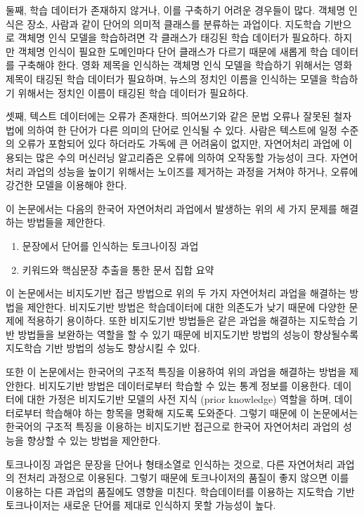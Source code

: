 \documentclass[oneside, ko,phd]{snuthesis_utf8_kor}
\begin{document}
둘째, 학습 데이터가 존재하지 않거나, 이를 구축하기 어려운 경우들이 많다.
객체명 인식은 장소, 사람과 같이 단어의 의미적 클래스를 분류하는 과업이다.
지도학습 기반으로 객체명 인식 모델을 학습하려면 각 클래스가 태깅된 학습 데이터가 필요하다.
하지만 객체명 인식이 필요한 도메인마다 단어 클래스가 다르기 때문에 새롭게 학습 데이터를 구축해야 한다.
영화 제목을 인식하는 객체명 인식 모델을 학습하기 위해서는 영화 제목이 태깅된 학습 데이터가 필요하며, 뉴스의 정치인 이름을 인식하는 모델을 학습하기 위해서는 정치인 이름이 태깅된 학습 데이터가 필요하다.

셋째, 텍스트 데이터에는 오류가 존재한다.
띄어쓰기와 같은 문법 오류나 잘못된 철자법에 의하여 한 단어가 다른 의미의 단어로 인식될 수 있다.
사람은 텍스트에 일정 수준의 오류가 포함되어 있다 하더라도 가독에 큰 어려움이 없지만, 자연어처리 과업에 이용되는 많은 수의 머신러닝 알고리즘은 오류에 의하여 오작동할 가능성이 크다.
자연어처리 과업의 성능을 높이기 위해서는 노이즈를 제거하는 과정을 거쳐야 하거나, 오류에 강건한 모델을 이용해야 한다.

이 논문에서는 다음의 한국어 자연어처리 과업에서 발생하는 위의 세 가지 문제를 해결하는 방법들을 제안한다.

\begin{enumerate}
    \item 문장에서 단어를 인식하는 토크나이징 과업
    \item 키워드와 핵심문장 추출을 통한 문서 집합 요약
\end{enumerate}

이 논문에서는 비지도기반 접근 방법으로 위의 두 가지 자연어처리 과업을 해결하는 방법을 제안한다.
비지도기반 방법은 학습데이터에 대한 의존도가 낮기 때문에 다양한 문제에 적용하기 용이하다.
또한 비지도기반 방법들은 같은 과업을 해결하는 지도학습 기반 방법들을 보완하는 역할을 할 수 있기 때문에 비지도기반 방법의 성능이 향상될수록 지도학습 기반 방법의 성능도 향상시킬 수 있다.

또한 이 논문에서는 한국어의 구조적 특징을 이용하여 위의 과업을 해결하는 방법을 제안한다.
비지도기반 방법은 데이터로부터 학습할 수 있는 통계 정보를 이용한다.
데이터에 대한 가정은 비지도기반 모델의 사전 지식 (prior knowledge) 역할을 하며, 데이터로부터 학습해야 하는 항목을 명확해 지도록 도와준다.
그렇기 때문에 이 논문에서는 한국어의 구조적 특징을 이용하는 비지도기반 접근으로 한국어 자연어처리 과업의 성능을 향상할 수 있는 방법을 제안한다.

토크나이징 과업은 문장을 단어나 형태소열로 인식하는 것으로, 다른 자연어처리 과업의 전처리 과정으로 이용된다.
그렇기 때문에 토크나이저의 품질이 좋지 않으면 이를 이용하는 다른 과업의 품질에도 영향을 미친다.
학습데이터를 이용하는 지도학습 기반 토크나이저는 새로운 단어를 제대로 인식하지 못할 가능성이 높다.
\end{document}
